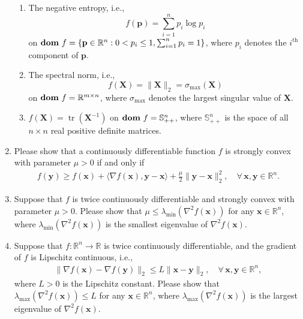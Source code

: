 \documentclass[11pt,letter,notitlepage]{article}
\DeclareMathOperator*{\dom}{\bf dom\,}
\begin{document}
\begin{exercise}
\begin{enumerate}
\begin{enumerate}
            \item
            The negative entropy, i.e.,
            $$
            f(\mathbf{p})=\sum_{i=1}^n p_i\log p_i
            $$
            on $\dom f=\{ \mathbf{p}\in\mathbb{R}^n:0<p_i\le 1, \sum_{i=1}^n p_i=1\}$, where $p_i$ denotes the $i^{\text{th}}$ component of $\mathbf{p}$.
            
            \item
            The spectral norm, i.e.,
            $$
            f(\mathbf{X})=\|\mathbf{X}\|_2=\sigma_{\max}(\textbf{X})
            $$
            on $\dom f=\mathbb{R}^{m\times n}$,
            where $\sigma_{\max}$ denotes the largest singular value of $\textbf{X}$.
            
            \item
            $f(\mathbf{X})=\operatorname{tr} (\mathbf{X}^{-1})$ on $\dom f=\mathbb{S}_{++}^n$, where $\mathbb{S}_{++}^n$ is the space of all $n\times n$ real positive definite matrices.
            
        \end{enumerate}

    \item
    Please show that a continuously differentiable function $f$ is strongly convex with parameter $\mu>0$ if and only if 
    \begin{align*}
        f(\mathbf{y})\ge f(\mathbf{x})+\langle\nabla f(\mathbf{x}),\mathbf{y}-\mathbf{x}\rangle+\frac{\mu}{2}\|\mathbf{y}-\mathbf{x}\|_2^2,\quad \forall\, \mathbf{x},\mathbf{y}\in\mathbb{R}^n.
    \end{align*}
    \item
    Suppose that $f$ is twice continuously differentiable and strongly convex with parameter $\mu>0$. Please show that $\mu\leq \lambda_{\min}(\nabla^2 f(\mathbf{x}))$ for any $\mathbf{x}\in\mathbb{R}^n$, where $\lambda_{\min}(\nabla^2 f(\mathbf{x}))$ is the smallest eigenvalue of $\nabla^2 f(\mathbf{x})$.
    \item Suppose that $f:\mathbb{R}^n\rightarrow\mathbb{R}$ is twice continuously differentiable, and the gradient of $f$ is Lipschitz continuous, i.e.,
    \begin{align*}
        \|\nabla f(\mathbf{x})-\nabla f(\mathbf{y})\|_2\le L\|\mathbf{x}-\mathbf{y}\|_2,\quad \forall\,\mathbf{x},\mathbf{y}\in\mathbb{R}^n,
    \end{align*}
    where $L>0$ is the Lipschitz constant. Please show that $\lambda_{\max}(\nabla^2f(\mathbf{x}))\leq L$ for any $\mathbf{x}\in\mathbb{R}^n$, where $\lambda_{\max}(\nabla^2f(\mathbf{x}))$ is the largest eigenvalue of $\nabla^2 f(\mathbf{x})$.
    

\end{enumerate}
\end{exercise}
\end{document}
